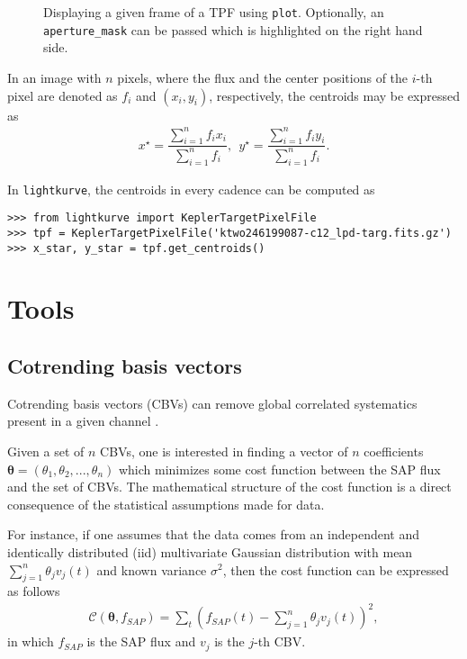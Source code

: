 \documentclass[twocolumn]{aastex62}
\begin{document}
\begin{figure}[!htb]
    \centering
    \caption{Displaying a given frame of a TPF using \texttt{plot}.
    Optionally, an \texttt{aperture\_mask} can be passed which is
    highlighted on the right hand side.}
    \label{fig:plot-method}
\end{figure}

In an image with $n$ pixels, where the flux and the center positions of the
$i$-th pixel are denoted as $f_i$ and $(x_i, y_i)$, respectively, the centroids
may be expressed as
\begin{align}
    x^{\star} = \dfrac{\sum_{i=1}^{n} f_i x_i}{\sum_{i=1}^{n}f_i},
    ~~y^{\star} = \dfrac{\sum_{i=1}^{n} f_i y_i}{\sum_{i=1}^{n}f_i}.
\end{align}

In \texttt{lightkurve}, the centroids in every cadence can be computed as
\begin{verbatim}
>>> from lightkurve import KeplerTargetPixelFile
>>> tpf = KeplerTargetPixelFile('ktwo246199087-c12_lpd-targ.fits.gz')
>>> x_star, y_star = tpf.get_centroids()
\end{verbatim}


\section{Tools}

\subsection{Cotrending basis vectors}

Cotrending basis vectors (CBVs) can remove global correlated
systematics present in a given channel \cite{smith2012}.

Given a set of $n$ CBVs, one is interested in finding a vector of $n$
coefficients $\bm{\theta}=(\theta_1, \theta_2, ..., \theta_n)$ which minimizes
some cost function between the SAP flux and the set of CBVs. The mathematical
structure of the cost function is a direct consequence of the statistical
assumptions made for data.

For instance, if one assumes that the data comes from an independent and
identically distributed (iid) multivariate Gaussian distribution with mean
$\sum_{j=1}^{n}\theta_j v_{j}(t)$ and known variance $\sigma^2$, then the
cost function can be expressed as follows
\begin{align}
    \mathcal{C}(\bm{\theta}, f_{SAP}) = \sum_{t}\left(f_{SAP}(t)
    - \sum_{j=1}^{n}\theta_j v_{j}(t)\right)^2,
\label{eq:chi-square}
\end{align}
in which $f_{SAP}$ is the SAP flux and $v_j$ is the $j$-th CBV.
\end{document}
